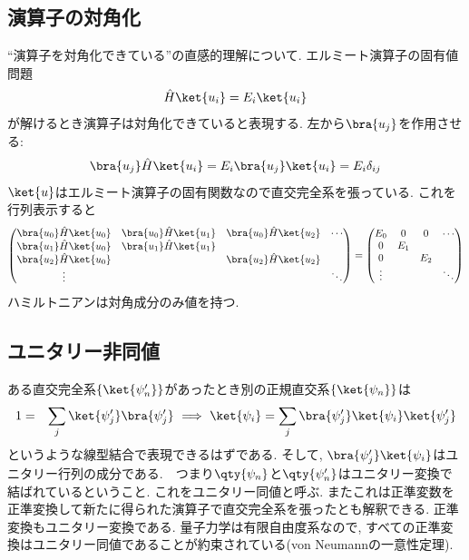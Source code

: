 \documentclass[10.5pt,a4paper]{jreport}
\begin{document}
\subsection{演算子の対角化}
``演算子を対角化できている''の直感的理解について. エルミート演算子の固有値問題
\begin{eqnarray}
  \hat{H}\ket{u_i} = E_i\ket{u_i}
\end{eqnarray}
が解けるとき演算子は対角化できていると表現する. 左から$\bra{u_j}$を作用させる:
\begin{eqnarray}
  \bra{u_j}\hat{H}\ket{u_i} = E_i\bra{u_j}\ket{u_i} = E_i\delta_{ij}
\end{eqnarray}
$\ket{u}$はエルミート演算子の固有関数なので直交完全系を張っている. これを行列表示すると
\begin{eqnarray}
  \begin{pmatrix}
    \bra{u_0}\hat{H}\ket{u_0}&\bra{u_0}\hat{H}\ket{u_1}&\bra{u_0}\hat{H}\ket{u_2}&\cdots\\
    \bra{u_1}\hat{H}\ket{u_0}&\bra{u_1}\hat{H}\ket{u_1}&&\\
    \bra{u_2}\hat{H}\ket{u_0}&&\bra{u_2}\hat{H}\ket{u_2}&\\
    \vdots&&&\ddots
  \end{pmatrix}
  =
  \begin{pmatrix}
    E_0&0&0&\cdots\\
    0&E_1&&\\
    0&&E_2&\\
    \vdots&&&\ddots
  \end{pmatrix}
\end{eqnarray}
ハミルトニアンは対角成分のみ値を持つ.
\subsection{ユニタリー非同値}
ある直交完全系$\{\ket{\psi'_n}\}$があったとき別の正規直交系$\{\ket{\psi_n}\}$は
\begin{eqnarray}
  1 &=& \sum_j\ket{\psi'_j}\bra{\psi'_j}\ \Longrightarrow\ \ket{\psi_i} = \sum_j \bra{\psi'_j}\ket{\psi_i}\ket{\psi'_j}
\end{eqnarray}
というような線型結合で表現できるはずである. そして, $\bra{\psi'_j}\ket{\psi_i}$はユニタリー行列の成分である.　つまり$\qty{\psi_n}$と$\qty{\psi'_n}$はユニタリー変換で結ばれているということ. これをユニタリー同値と呼ぶ. またこれは正準変数を正準変換して新たに得られた演算子で直交完全系を張ったとも解釈できる. 正準変換もユニタリー変換である. 量子力学は有限自由度系なので, すべての正準変換はユニタリー同値であることが約束されている(von Neumannの一意性定理).
\end{document}
